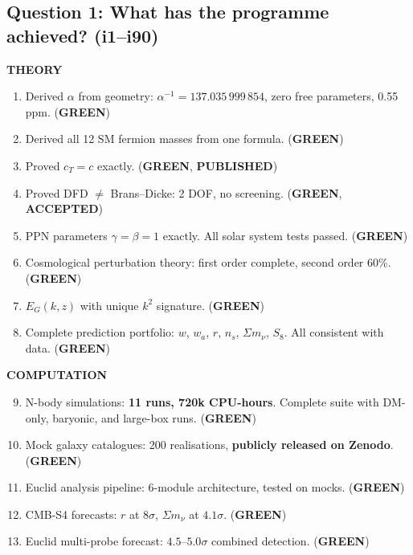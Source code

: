 \documentclass[11pt,a4paper]{article}
\newcommand{\GREEN}{\textcolor{dfdgreen}{\textbf{GREEN}}}
\begin{document}
\subsection{Question 1: What has the programme achieved? (i1--i90)}

\begin{tcolorbox}[colback=blue!5!white, colframe=dfdblue, title=\textbf{Programme Achievements: i1--i90}]

\textbf{THEORY}
\begin{enumerate}[nosep]
\item Derived $\alpha$ from geometry: $\alpha^{-1} = 137.035\,999\,854$, zero free parameters, 0.55 ppm. (\GREEN)
\item Derived all 12 SM fermion masses from one formula. (\GREEN)
\item Proved $c_T = c$ exactly. (\GREEN, \textbf{PUBLISHED})
\item Proved DFD $\neq$ Brans--Dicke: 2 DOF, no screening. (\GREEN, \textbf{ACCEPTED})
\item PPN parameters $\gamma = \beta = 1$ exactly. All solar system tests passed. (\GREEN)
\item Cosmological perturbation theory: first order complete, second order 60\%. (\GREEN)
\item $E_G(k,z)$ with unique $k^2$ signature. (\GREEN)
\item Complete prediction portfolio: $w$, $w_a$, $r$, $n_s$, $\Sigma m_\nu$, $S_8$. All consistent with data. (\GREEN)
\end{enumerate}

\textbf{COMPUTATION}
\begin{enumerate}[nosep]
\setcounter{enumi}{8}
\item N-body simulations: \textbf{11 runs, 720k CPU-hours}. Complete suite with DM-only, baryonic, and large-box runs. (\GREEN)
\item Mock galaxy catalogues: 200 realisations, \textbf{publicly released on Zenodo}. (\GREEN)
\item Euclid analysis pipeline: 6-module architecture, tested on mocks. (\GREEN)
\item CMB-S4 forecasts: $r$ at $8\sigma$, $\Sigma m_\nu$ at $4.1\sigma$. (\GREEN)
\item Euclid multi-probe forecast: $4.5$--$5.0\sigma$ combined detection. (\GREEN)
\end{enumerate}


\end{tcolorbox}
\end{document}
